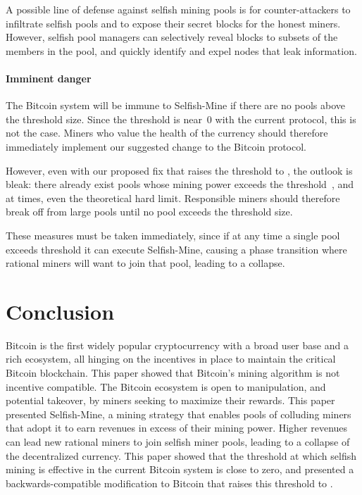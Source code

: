 \documentclass[letterpaper]{llncs}
\newcommand{\negspace}{\vspace{-0.5\baselineskip}}
\begin{document}
A possible line of defense against selfish mining pools is for counter-attackers to infiltrate selfish pools and to expose their secret blocks for the honest miners. 
However, selfish pool managers can selectively reveal blocks to subsets of the members in the pool, and quickly identify and expel nodes that leak information. 


\paragraph{Imminent danger} 

The Bitcoin system will be immune to Selfish-Mine if there are no pools above the threshold size. Since the threshold is near~0 with the current protocol, this is not the case. 
Miners who value the health of the currency should therefore immediately implement our suggested change to the Bitcoin protocol. 

However, even with our proposed fix that raises the threshold to , the outlook is bleak: there already exist pools whose mining power exceeds the  threshold~\cite{poolWatch2013poolStats}, and at times, even the  theoretical hard limit. 
Responsible miners should therefore break off from large pools until no pool exceeds the threshold size.

These measures must be taken immediately, since if at any time a single pool exceeds threshold it can execute Selfish-Mine, causing a phase transition where rational miners will want to join that pool, leading to a collapse. 



    \section{Conclusion} \label{sec:conclusion}
    \negspace

Bitcoin is the first widely popular cryptocurrency with a broad user base and a rich ecosystem, all hinging on the incentives in place to maintain the critical Bitcoin blockchain.
This paper showed that Bitcoin's mining algorithm is not incentive compatible. The Bitcoin ecosystem is open to manipulation, and potential takeover, by miners seeking to maximize their rewards. This paper
presented Selfish-Mine, a mining strategy that enables pools of colluding miners that adopt it to earn revenues in excess of their mining power. Higher revenues can lead new rational miners to join
selfish miner pools, leading to a collapse of the decentralized currency. This paper showed that the threshold at which selfish mining is effective in the current Bitcoin system is close to zero, and presented
a backwards-compatible modification to Bitcoin that raises this threshold to . 
\end{document}
